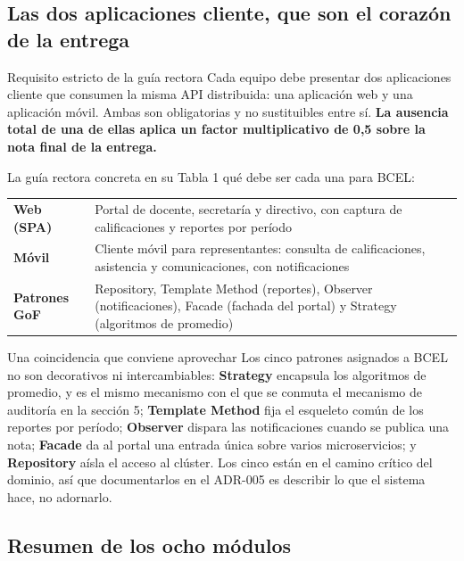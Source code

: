 \documentclass[11pt,a4paper]{article}
\begin{document}
\subsection{Las dos aplicaciones cliente, que son el corazón de la entrega}

\begin{pisoBox}{Requisito estricto de la guía rectora}
	Cada equipo debe presentar dos aplicaciones cliente que consumen la misma API distribuida: una aplicación web y una aplicación móvil. Ambas son obligatorias y no sustituibles entre sí. \textbf{La ausencia total de una de ellas aplica un factor multiplicativo de 0,5 sobre la nota final de la entrega.}
\end{pisoBox}

La guía rectora concreta en su Tabla 1 qué debe ser cada una para BCEL:

\begin{center}
	\small
	\begin{tabular}{@{}p{2.5cm}p{12.5cm}@{}}
		\toprule
		\textbf{Web (SPA)} & Portal de docente, secretaría y directivo, con captura de calificaciones y reportes por período \\
		\addlinespace
		\textbf{Móvil} & Cliente móvil para representantes: consulta de calificaciones, asistencia y comunicaciones, con notificaciones \\
		\addlinespace
		\textbf{Patrones GoF} & Repository, Template Method (reportes), Observer (notificaciones), Facade (fachada del portal) y Strategy (algoritmos de promedio) \\
		\bottomrule
	\end{tabular}
\end{center}

\begin{defBox}{Una coincidencia que conviene aprovechar}
	Los cinco patrones asignados a BCEL no son decorativos ni intercambiables: \textbf{Strategy} encapsula los algoritmos de promedio, y es el mismo mecanismo con el que se conmuta el mecanismo de auditoría en la sección 5; \textbf{Template Method} fija el esqueleto común de los reportes por período; \textbf{Observer} dispara las notificaciones cuando se publica una nota; \textbf{Facade} da al portal una entrada única sobre varios microservicios; y \textbf{Repository} aísla el acceso al clúster. Los cinco están en el camino crítico del dominio, así que documentarlos en el ADR-005 es describir lo que el sistema hace, no adornarlo.
\end{defBox}

\subsection{Resumen de los ocho módulos}
\end{document}
